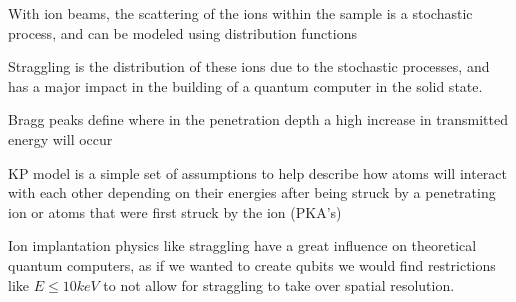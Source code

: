\begin{myitemize}
	\item With ion beams, the scattering of the ions within the sample is a stochastic process, and can be modeled using distribution functions
	\item Straggling is the distribution of these ions due to the stochastic processes, and has a major impact in the building of a quantum computer in the solid state.
	\item Bragg peaks define where in the penetration depth a high increase in transmitted energy will occur
	\item KP model is a simple set of assumptions to help describe how atoms will interact with each other depending on their energies after being struck by a penetrating ion or atoms that were first struck by the ion (PKA's)
	\item Ion implantation physics like straggling have a great influence on theoretical quantum computers, as if we wanted to create qubits we would find restrictions like $E \leq 10 keV$ to not allow for straggling to take over spatial resolution.
\end{myitemize}

